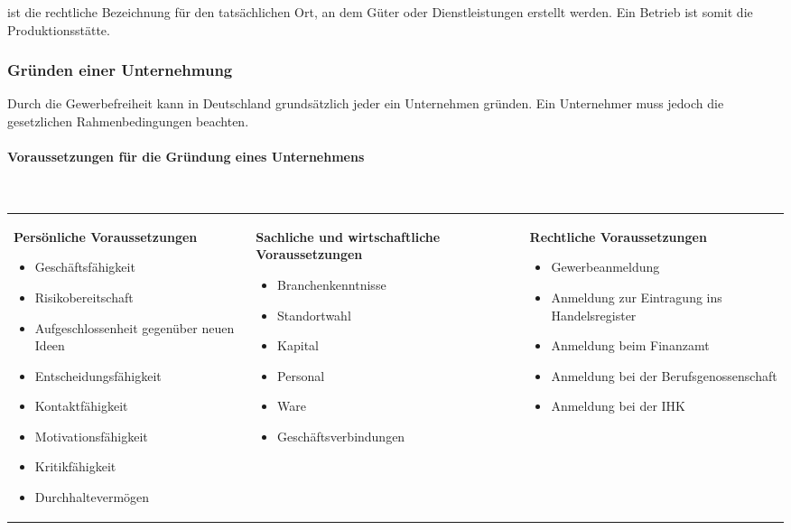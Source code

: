  ist die rechtliche Bezeichnung für den tatsächlichen Ort, an dem Güter oder Dienstleistungen erstellt werden. Ein Betrieb ist somit die Produktionsstätte.

\subsubsection{Gründen einer Unternehmung}
Durch die Gewerbefreiheit kann in Deutschland grundsätzlich jeder ein Unternehmen gründen. Ein Unternehmer muss jedoch die gesetzlichen Rahmenbedingungen beachten.

\paragraph{Voraussetzungen für die Gründung eines Unternehmens} ~\\

\begin{table}[!h]
\small
\begin{tabular}{lll}
	\parbox[t]{4.5cm}{
	{\bf Persönliche\\Voraussetzungen}
	\begin{itemize}
		\item Geschäftsfähigkeit
		\item Risikobereitschaft
		\item Aufgeschlossenheit gegenüber neuen Ideen
		\item Entscheidungsfähigkeit
		\item Kontaktfähigkeit
		\item Motivationsfähigkeit
		\item Kritikfähigkeit
		\item Durchhaltevermögen
	\end{itemize}
	} &
	\parbox[t]{4.5cm}{
	{\bf Sachliche und wirtschaftliche Voraussetzungen}
	\begin{itemize}
		\item Branchenkenntnisse
		\item Standortwahl
		\item Kapital
		\item Personal
		\item Ware
		\item Geschäftsverbindungen
	\end{itemize}
	} &
	\parbox[t]{4.5cm}{
	{\bf Rechtliche Voraussetzungen}
	\begin{itemize}
		\item Gewerbeanmeldung
		\item Anmeldung zur Eintragung ins Handelsregister
		\item Anmeldung beim Finanzamt
		\item Anmeldung bei der Berufsgenossenschaft
		\item Anmeldung bei der IHK
	\end{itemize}
	}
\end{tabular}
\end{table}

